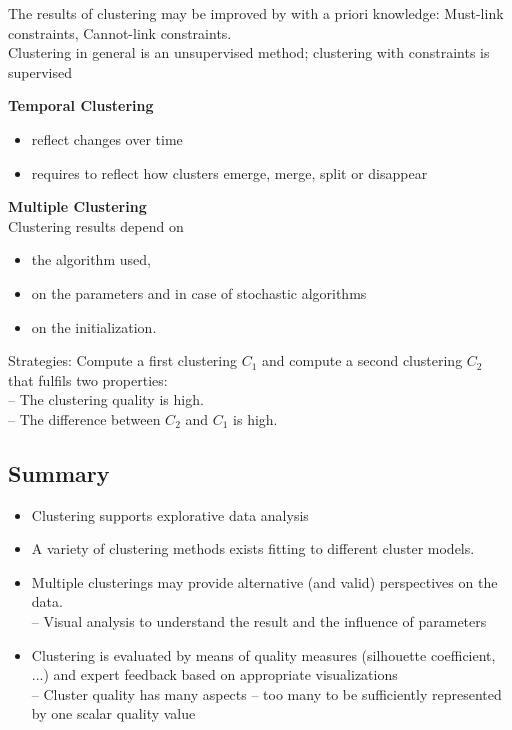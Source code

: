\documentclass[11pt,ngerman]{article}
\begin{document}
The results of clustering may be improved by with a priori knowledge: Must-link constraints, Cannot-link constraints.\\
Clustering in general is an unsupervised method;
clustering with constraints is supervised

\textbf{Temporal Clustering}
\begin{itemize}
	\item reflect changes
over time
	\item requires to
reflect how clusters emerge, merge, split or
disappear
\end{itemize}

\textbf{Multiple Clustering}\\
Clustering results depend on
\begin{itemize}
\item the algorithm used,
\item on the parameters and in case of stochastic algorithms
\item on the initialization.
\end{itemize}
Strategies:
Compute a first clustering $C_1$ and compute a second
clustering $C_2$ that fulfils two properties:\\
– The clustering quality is high.\\
– The difference between $C_2$ and $C_1$ is high.

\subsection{Summary}
\begin{itemize}
\item Clustering supports explorative data analysis
\item A variety of clustering methods exists fitting to different
cluster models.
\item Multiple clusterings may provide alternative (and valid)
perspectives on the data.\\
– Visual analysis to understand the result and the influence of
parameters
\item Clustering is evaluated by means of quality measures
(silhouette coefficient, ...) and expert feedback based on
appropriate visualizations\\ – Cluster quality has many aspects – too many to be sufficiently
represented by one scalar quality value
\end{itemize}
\end{document}
